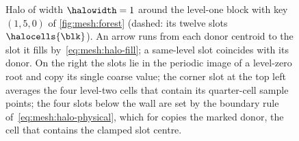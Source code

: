 \begin{figure}
  \caption{Halo of width $\halowidth=1$ around the level-one block with key
    $(1,5,0)$ of \cref{fig:mesh:forest} (dashed: its twelve slots
    $\halocells{\blk}$). An arrow runs from each donor centroid to the slot it
    fills by~\cref{eq:mesh:halo-fill}; a same-level slot coincides with its
    donor. On the right the slots lie in the periodic image of a level-zero
    root and copy its single coarse value; the corner slot at the top left
    averages the four level-two cells that contain its quarter-cell sample
    points; the four slots below the wall are set by the boundary rule
    of~\cref{eq:mesh:halo-physical}, which for  copies the
    marked donor, the cell that contains the clamped slot centre.}
  \label{fig:mesh:halo}
\end{figure}
